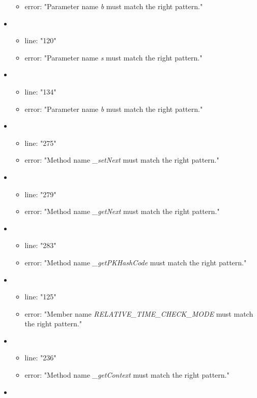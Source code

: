 \begin{itemize}
\begin{itemize}
		\item error: "Parameter name \emph{b} must match the right pattern." 
	\end{itemize}
	\item 
	\begin{itemize} 
		\item line: "120" 
		\item error: "Parameter name \emph{s} must match the right pattern." 
	\end{itemize}
	\item 
	\begin{itemize} 
		\item line: "134" 
		\item error: "Parameter name \emph{b} must match the right pattern." 
	\end{itemize}
	\item 
	\begin{itemize} 
		\item line: "275" 
		\item error: "Method name \emph{\_setNext} must match the right pattern." 
	\end{itemize}
	\item 
	\begin{itemize} 
		\item line: "279" 
		\item error: "Method name \emph{\_getNext} must match the right pattern." 
	\end{itemize}
	\item 
	\begin{itemize} 
		\item line: "283" 
		\item error: "Method name \emph{\_getPKHashCode} must match the right pattern." 
	\end{itemize}
	\item 
	\begin{itemize} 
		\item line: "125" 
		\item error: "Member name \emph{RELATIVE\_TIME\_CHECK\_MODE} must match the right pattern." 
	\end{itemize}
	\item 
	\begin{itemize} 
		\item line: "236" 
		\item error: "Method name \emph{\_getContext} must match the right pattern." 
	\end{itemize}
	\item 

\end{itemize}
